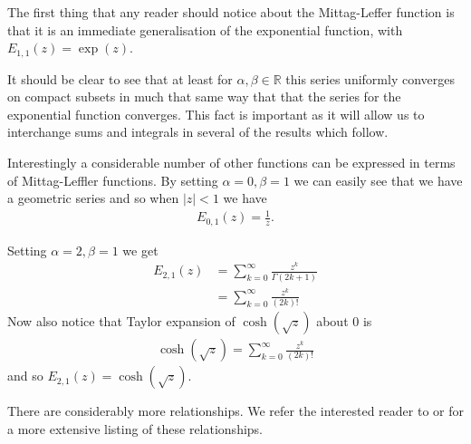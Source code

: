 The first thing that any reader should notice about the Mittag-Leffer function is that it is an immediate generalisation of the exponential function, with $ E_{1, 1}(z) = \exp(z) $. 

It should be clear to see that at least for $ \alpha, \beta \in \mathbb{R} $ this series uniformly converges on compact subsets in much that same way that that the series for the exponential function converges. This fact is important as it will allow us to interchange sums and integrals in several of the results which follow.

Interestingly a considerable number of other functions can be expressed in terms of Mittag-Leffler functions. By setting $ \alpha = 0, \beta = 1 $ we can easily see that we have a geometric series and so when $ |z| < 1 $ we have
\begin{align}
    E_{0,1}(z) = \frac{1}{z}.
\end{align}

Setting $ \alpha = 2, \beta = 1 $ we get
\begin{align}
    E_{2,1}(z) &= \sum_{k=0}^\infty \frac{z^k}{\Gamma(2k + 1)} \\
            &= \sum_{k=0}^\infty \frac{z^k}{(2k)!}
\end{align}
Now also notice that Taylor expansion of $ \cosh(\sqrt{z}) $ about 0 is
\begin{align}
    \cosh(\sqrt{z}) = \sum_{k=0}^\infty \frac{z^k}{(2k)!}
\end{align}
and so $ E_{2,1}(z) = \cosh(\sqrt{z}) $. 

There are considerably more relationships. We refer the interested reader to \cite{Podlubny1999} or \cite{Samko1993} for a more extensive listing of these relationships.

